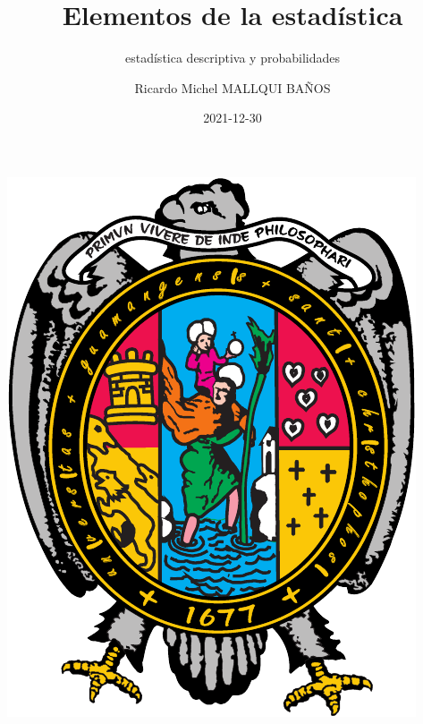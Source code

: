 \documentclass[10pt,]{krantz}
\title{Elementos de la estadística}
\subtitle{estadística descriptiva y probabilidades}
\author{Ricardo Michel MALLQUI BAÑOS}
\date{2021-12-30}
\theoremstyle{definition}
\theoremstyle{definition}
\theoremstyle{definition}
\theoremstyle{definition}
\theoremstyle{remark}
\begin{document}
\maketitle

\thispagestyle{empty}
\begin{center}
\includegraphics{U.pdf}
\end{center}


{
\hypersetup{linkcolor=}
\setcounter{tocdepth}{2}
\tableofcontents
}
\listoftables
\listoffigures
\newcommand{\N}{\mathbb{N}}
\newcommand{\R}{\mathbb{R}}
\newcommand{\CC}{\mathbb{C}}
\newcommand{\I}{\mathbb{I}}
\newcommand{\f}{\mathbb{f}}
\newcommand{\X}{\mathbb{X}}
\newcommand{\D}{\mathbb{D}}
\newcommand{\Z}{\mathbb{Z}}
\newcommand{\Q}{\mathbb{Q}}
\newcommand{\norm}[1]{\left\Vert#1\right\Vert}
\newcommand{\abs}[1]{\left\vert#1\right\vert}
\newcommand{\set}[1]{\left\{#1\right\}}
\newcommand{\seq}[1]{\left<#1\right>}
\newcommand{\co}[1]{\left[#1\right]}
\newcommand{\cc}[1]{\left(#1\right)}
\newcommand{\J}{\mathcal{J}}
\newcommand{\K}{\mathcal{K}}
\newcommand{\M}{\mathcal{M}}
\newcommand{\F}{\mathcal{F}}
\end{document}
